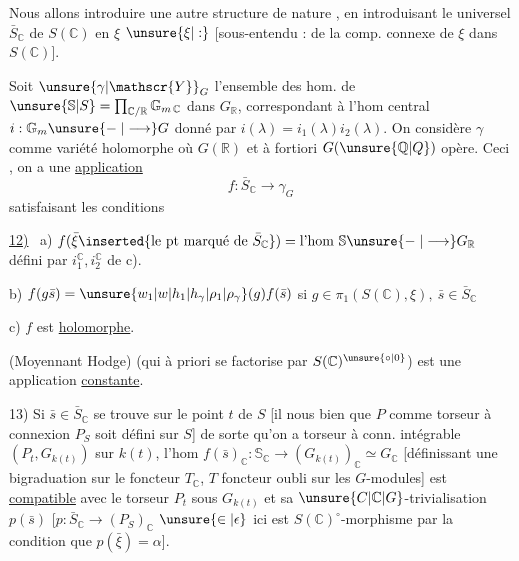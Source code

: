 Nous allons introduire une autre structure de nature , en introduisant le  universel $\bar S_{\mathbb C}$ de $S(\mathbb C)$ en $\xi$ $\unsure{\xi|:}$ [sous-entendu : de la comp. connexe de $\xi$ dans $S(\mathbb C)$].

Soit $\unsure{\gamma|\mathscr{Y}}_{G}$ l'ensemble des hom. de $\unsure{\mathbb S|S}=\prod_{\mathbb C/\mathbb R}\mathbb G_{m\,\mathbb C}$ dans $G_{\mathbb R}$, correspondant à l'hom central  $i:\mathbb G_m \unsure{\relbar|\longrightarrow} G$ donné par $i(\lambda)=i_1(\lambda)i_2(\lambda)$. \margin{\rule{0.35pt}{2.1\baselineskip}}On considère $\gamma$ comme variété  holomorphe où  $G(\mathbb R)$ et à fortiori $G(\unsure{\mathbb Q|Q})$ opère. Ceci , on a une \uline{application}
\[
\boxed{f:\bar S_{\mathbb C}\longrightarrow\gamma_G}
\]
satisfaisant les conditions

\uline{12)} \ a) $f(\bar\xi\inserted{\text{le pt marqué de }\bar S_{\mathbb C}})={}\text{l'hom }\mathbb S\unsure{\relbar|\longrightarrow} G_{\mathbb R}$ défini par $i_1^{\mathbb C},i_2^{\mathbb C}$ de c).

b) $f(g\bar s)=\unsure{w_{1}|w|h_{1}|h_{\gamma}|\rho_{1}|\rho_{\gamma}}(g)f(\bar s)$ si $g\in\pi_1(S(\mathbb C),\xi),\ \bar s\in\bar S_{\mathbb C}$

c) $f$ est \uline{holomorphe}.

 (Moyennant Hodge)   (qui à priori  se factorise par  $S(\mathbb C)^{\unsure{\circ|0}}$) est une application \uline{constante}.

13) Si $\bar s\in\bar S_{\mathbb C}$ se trouve sur le point $t$ de $S$ [il nous  bien que $P$ comme torseur à connexion  $P_S$ soit défini sur $S$] de sorte qu'on a torseur à conn. intégrable  $(P_t,G_{k(t)})$ sur $k(t)$,  l'hom $f(\bar s)_{\mathbb C}:\mathbb S_{\mathbb C}\longrightarrow(G_{k(t)})_{\mathbb C}\simeq G_{\mathbb C}$ [définissant une bigraduation sur le foncteur $T_{\mathbb C}$, $T$ foncteur oubli sur les $G$-modules] est \uline{compatible} avec le torseur $P_t$ sous $G_{k(t)}$ et sa $\unsure{C|\mathbb C|G}$-trivialisation $p(\bar s)$ [$p:\bar S_{\mathbb C}\longrightarrow(P_S)_{\mathbb C}$ $\unsure{\in|\epsilon}$ ici est  $S(\mathbb C)^{\circ}$-morphisme  par la condition que $p(\bar\xi)=\alpha$].
